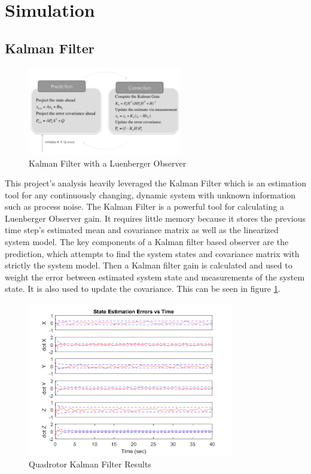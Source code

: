 \documentclass[12pt]{extarticle}
\begin{document}
\section{Simulation}{
\subsection{Kalman Filter}{
\begin{figure}[h!]
    \centering
    \includegraphics[width=0.6\textwidth,clip=true,trim={0cm 0 0cm 1cm}]{Images/Kalman-Filter-Step}
    \caption{Kalman Filter with a Luenberger Observer}\label{fig:Kal_filter_diagram}
\end{figure}
This project's analysis heavily leveraged the Kalman Filter which is an estimation tool for any continuously changing, dynamic system with unknown information such as process noise.  The Kalman Filter is a powerful tool for calculating a Luenberger Observer gain. It requires little memory because it stores the previous time step's estimated mean and covariance matrix as well as the linearized system model. The key components of a Kalman filter based observer are the prediction, which attempts to find the system states and covariance matrix with strictly the system model. Then a Kalman filter gain is calculated and used to weight the error between estimated system state and measurements of the system state. It is also used to update the covariance. This can be seen in figure \ref{fig:Kal_filter_diagram}.

\begin{figure}[h!]
    \centering
    \includegraphics[width=0.8\textwidth,clip=true,trim={0cm 0 0cm 0}]{Images/KF.png}
    \caption{Quadrotor Kalman Filter Results}
    \label{fig:Kalman_filter_res}
\end{figure}


}}
\end{document}
